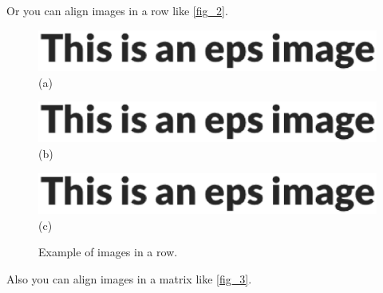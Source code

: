 \documentclass{article}
\begin{document}
    Or you can align images in a row like \autoref{fig_2}.

    \begin{figure}[htb]
        \centering
        \begin{minipage}[t]{0.33\linewidth}
            \centering
            \includegraphics[width=\linewidth]{example}
            (a)
        \end{minipage}
        \begin{minipage}[t]{0.33\linewidth}
            \centering
            \includegraphics[width=\linewidth]{example}
            (b)
        \end{minipage}
        \begin{minipage}[t]{0.33\linewidth}
            \centering
            \includegraphics[width=\linewidth]{example}
            (c)
        \end{minipage}
   
        \caption{Example of images in a row.}
        \label{fig_2}
    \end{figure}

    Also you can align images in a matrix like \autoref{fig_3}.
\end{document}
